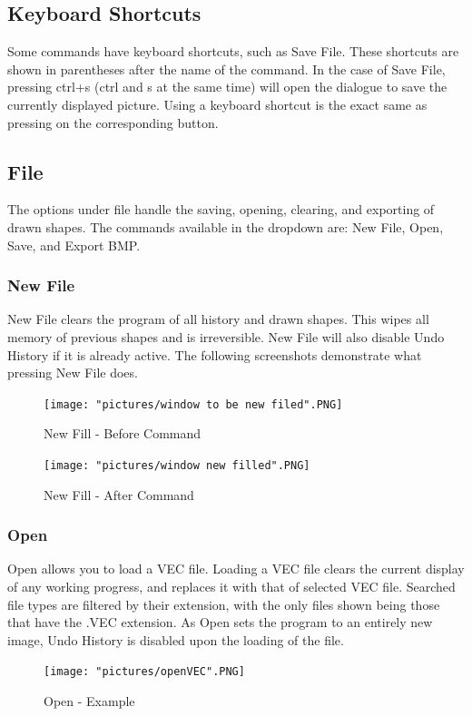 \documentclass[12pt]{article} %
\begin{document}
\subsection{Keyboard Shortcuts}
Some commands have keyboard shortcuts, such as Save File. These shortcuts are shown in parentheses after the name of the command. In the case of Save File, pressing ctrl+s (ctrl and s at the same time) will open the dialogue to save the currently displayed picture. Using a keyboard shortcut is the exact same as pressing on the corresponding button.

\subsection{File}
The options under file handle the saving, opening, clearing, and exporting of drawn shapes. The commands available in the dropdown are: New File, Open, Save, and Export BMP.

\subsubsection{New File}
New File clears the program of all history and drawn shapes. This wipes all memory of previous shapes and is irreversible. New File will also disable Undo History if it is already active. The following screenshots demonstrate what pressing New File does.

\begin{figure}[hbtp]
\caption{New Fill - Before Command}
\centering
\texttt{[image: "pictures/window to be new filed".PNG]}
\end{figure}

\begin{figure}[hbtp]
\caption{New Fill - After Command}
\centering
\texttt{[image: "pictures/window new filled".PNG]}
\end{figure}

\subsubsection{Open}
Open allows you to load a VEC file. Loading a VEC file clears the current display of any working progress, and replaces it with that of selected VEC file. Searched file types are filtered by their extension, with the only files shown being those that have the .VEC extension. As Open sets the program to an entirely new image, Undo History is disabled upon the loading of the file.

\begin{figure}[hbtp]
\caption{Open - Example}
\centering
\texttt{[image: "pictures/openVEC".PNG]}
\end{figure}
\end{document}
